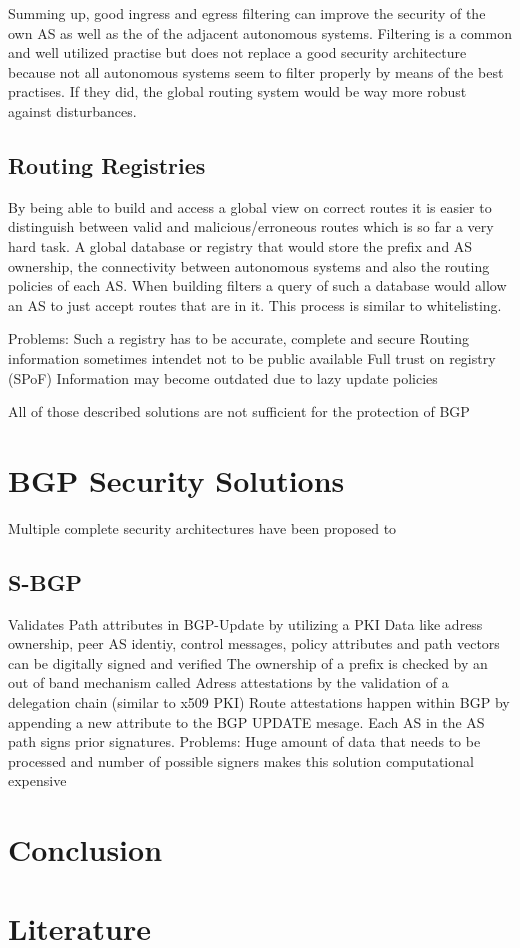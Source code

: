 \documentclass[12pt,a4paper]{IEEEtran}
\begin{document}
		Summing up, good ingress and egress filtering can improve the security of the own AS as well as the of the  adjacent autonomous systems.
		Filtering is a common and well utilized practise but does not replace a good security architecture because not all autonomous systems seem to filter properly by means of the best practises. If they did, the global routing system would be way more robust against disturbances. 

       \subsection{Routing Registries}
		By being able to build and access a global view on correct routes it is easier to distinguish between valid and malicious/erroneous routes which is so far a very hard task. 
		A global database or registry that would store the prefix and AS ownership, the connectivity between autonomous systems and also the routing policies of each AS. 	
		When building filters a query of such a database would allow an AS to just accept routes that are in it. This process is similar to whitelisting.
		
			
		Problems: 
			Such a registry has to be accurate, complete and secure
			Routing information sometimes intendet not to be public available
			Full trust on registry (SPoF)
			Information may become outdated due to lazy update policies
       		
       
       
       		
       			
	All of those described solutions are not sufficient for the protection of BGP

       \section{BGP Security Solutions}

       Multiple complete security architectures have been proposed to 
       \subsection{S-BGP}
			Validates Path attributes in BGP-Update by utilizing a PKI
			Data like adress ownership, peer AS identiy, control messages, policy attributes and path vectors can be digitally signed and verified
			The ownership of a prefix is checked by an out of band mechanism called Adress attestations by the validation of a delegation chain (similar to x509 PKI)
			Route attestations happen within BGP by appending a new attribute to the BGP UPDATE mesage. Each AS in the AS path signs prior signatures.
			Problems: 
				Huge amount of data that needs to be processed and number of possible signers makes this solution computational expensive
				
	\section{Conclusion}				

	
	\section{Literature}
\end{document}
